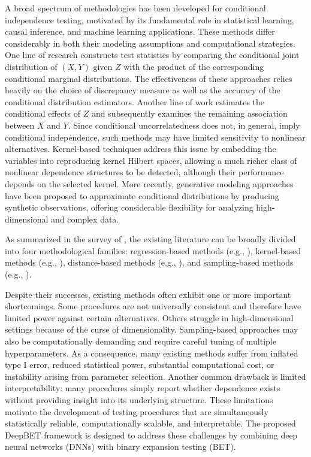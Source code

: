 \documentclass[12pt,reqno,oneside]{amsbook}
\theoremstyle{definition}
\theoremstyle{remark}
\begin{document}
\hspace{0.5cm}
A broad spectrum of methodologies has been developed for conditional independence testing, motivated by its fundamental role in statistical learning, causal inference, and machine learning applications. These methods differ considerably in both their modeling assumptions and computational strategies. One line of research constructs test statistics by comparing the conditional joint distribution of $(X,Y)$ given $Z$ with the product of the corresponding conditional marginal distributions. The effectiveness of these approaches relies heavily on the choice of discrepancy measure as well as the accuracy of the conditional distribution estimators. Another line of work estimates the conditional effects of $Z$ and subsequently examines the remaining association between $X$ and $Y$. Since conditional uncorrelatedness does not, in general, imply conditional independence, such methods may have limited sensitivity to nonlinear alternatives. Kernel-based techniques address this issue by embedding the variables into reproducing kernel Hilbert spaces, allowing a much richer class of nonlinear dependence structures to be detected, although their performance depends on the selected kernel. More recently, generative modeling approaches have been proposed to approximate conditional distributions by producing synthetic observations, offering considerable flexibility for analyzing high-dimensional and complex data.

\hspace{0.5cm}
As summarized in the survey of \cite{LiFan2020}, the existing literature can be broadly divided into four methodological families: regression-based methods (e.g., \cite{Shah_2020,Hoyer2008ANM,Zhang2017CausalDU,Zhang2023SCIT}), kernel-based methods (e.g., \cite{strobl2017approximate,Fukumizu2007KernelMO,zhang2012kernelbased}), distance-based methods (e.g., \cite{wang2015conditional,Su2014TestingCI,Su_White_2008,SuWhite2007}), and sampling-based methods (e.g., \cite{duong2022conditional,shi2021double,bellot2019conditional}).

\hspace{0.5cm}
Despite their successes, existing methods often exhibit one or more important shortcomings. Some procedures are not universally consistent and therefore have limited power against certain alternatives. Others struggle in high-dimensional settings because of the curse of dimensionality. Sampling-based approaches may also be computationally demanding and require careful tuning of multiple hyperparameters. As a consequence, many existing methods suffer from inflated type I error, reduced statistical power, substantial computational cost, or instability arising from parameter selection. Another common drawback is limited interpretability: many procedures simply report whether dependence exists without providing insight into its underlying structure. These limitations motivate the development of testing procedures that are simultaneously statistically reliable, computationally scalable, and interpretable. The proposed DeepBET framework is designed to address these challenges by combining deep neural networks (DNNs) with binary expansion testing (BET).
\end{document}
